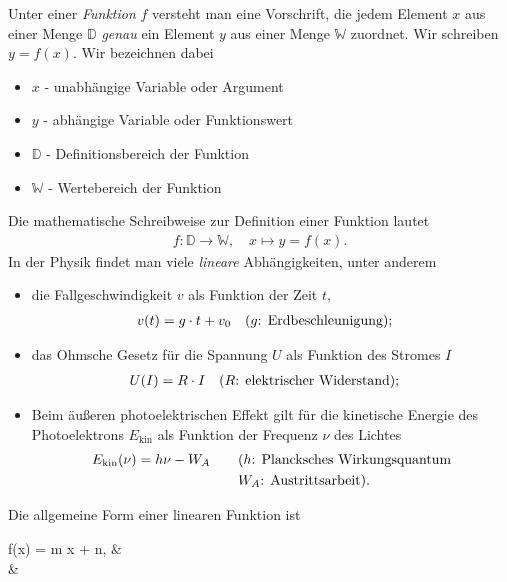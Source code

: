 Unter einer \emph{Funktion} $f$ versteht man eine Vorschrift, die jedem Element $x$ aus einer Menge $\mathbb{D}$ \emph{genau} ein Element $y$ aus einer Menge $\mathbb{W}$ zuordnet. Wir schreiben $y = f(x)$. Wir bezeichnen dabei 
\begin{itemize}
    \item $x$ - unabhängige Variable oder Argument 
    \item $y$ - abhängige Variable oder Funktionswert 
    \item $\mathbb{D}$ - Definitionsbereich der Funktion 
    \item $\mathbb{W}$ - Wertebereich der Funktion
\end{itemize}
Die mathematische Schreibweise zur Definition einer Funktion lautet 
\begin{align}
        f: \mathbb{D} \to \mathbb{W}, \quad x \mapsto y = f(x).
\end{align}
In der Physik findet man viele \emph{lineare} Abhängigkeiten, unter anderem 
\begin{itemize}
    \item die Fallgeschwindigkeit $v$ als Funktion der Zeit $t$,
    \begin{align}
            v(t) = g \cdot t + v_0 \qq{($g$: Erdbeschleunigung);}
    \end{align}
    \item das Ohmsche Gesetz für die Spannung $U$ als Funktion des Stromes $I$ 
    \begin{align}
            U(I) = R\cdot I \qq{($R$: elektrischer Widerstand);} 
    \end{align}
    \item Beim äußeren photoelektrischen Effekt gilt für die kinetische Energie des Photoelektrons $E_\text{kin}$ als Funktion der Frequenz $\nu$ des Lichtes 
    \begin{align}
            E_\text{kin}(\nu) = h \nu - W_A \qquad &\text{($h$: Plancksches Wirkungsquantum} \\
            &\text{$W_A$: Austrittsarbeit).} \notag
    \end{align}
\end{itemize}
Die allgemeine Form einer linearen Funktion ist 
\begin{mymathbox}[ams align, title={lineare Funktion}, colframe={FSUblau}] \label{eqn:2_lineare_Funktion_Normalform}
    f(x) = m x + n,  \qquad & \\
    & \notag
\end{mymathbox}

